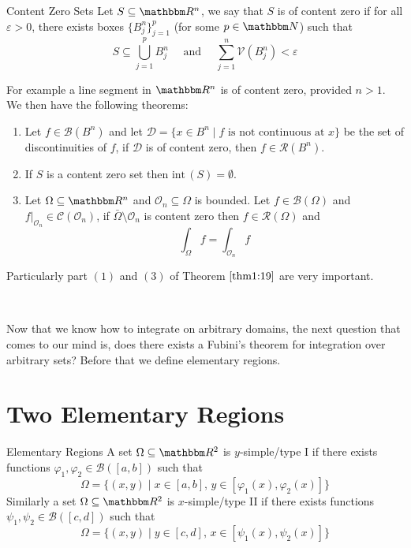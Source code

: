 \documentclass[Analysis-3.tex]{subfiles}
\begin{document}
\begin{Def}{Content Zero Sets}{}
    Let $S \subseteq \R^n$, we say that $S$ is of content zero if for all $\varepsilon > 0$, there exists boxes $\{ B_j^n \}_{j=1}^p$ (for some $p \in \N$) such that
    \[
        S \subseteq \bigcup_{j=1}^p B_j^n \quad \mbox{ and } \quad \sum_{j=1}^n \mathcal{V}(B^n_j) < \varepsilon
    \]
\end{Def}

For example a line segment in $\R^n$ is of content zero, provided $n > 1$. We then have the following theorems:

\begin{Thm}{}{}\label{thm1:19}
    \begin{enumerate}
        \item Let $f \in \mathscr{B}(B^n)$ and let $\mathcal{D} = \{ x \in B^n \mid f \mbox{ is not continuous at } x \}$ be the set of discontinuities of $f$, if $\mathcal{D}$ is of content zero, then $f \in \mathscr{R}(B^n)$.

        \item If $S$ is a content zero set then $\mathrm{int}\,(S) = \emptyset$.

        \item Let $\Omega \subseteq \R^n$ and $\mathcal{O}_n \subseteq \Omega$ is bounded. Let $f \in \mathscr{B}(\Omega)$ and $f\vert_{\mathcal{O}_n} \in \mathscr{C}(\mathcal{O}_n)$, if $\bar{\Omega}\setminus \mathcal{O}_n$ is content zero then $f \in \mathscr{R}(\Omega)$ and
              \[
                  \int_{\Omega} f = \int_{\mathcal{O}_n} f
              \]
    \end{enumerate}
\end{Thm}
Particularly part $(1)$ and $(3)$ of Theorem $\ref{thm1:19}$ are very important.

\

Now that we know how to integrate on arbitrary domains, the next question that comes to our mind is, does there exists a Fubini's theorem for integration over arbitrary sets? Before that we define elementary regions.

\section{Two Elementary Regions}

\begin{Def}{Elementary Regions}{}
    A set $\Omega \subseteq \R^2$ is $y$-simple/type I if there exists functions $\varphi_1, \varphi_2 \in \mathscr{B}([a,b])$ such that
    \[
        \Omega = \{ (x,y) \mid x \in [a,b], \, y \in [\varphi_1(x), \varphi_2(x)] \}
    \]
    Similarly a set $\Omega \subseteq \R^2$ is $x$-simple/type II if there exists functions $\psi_1, \psi_2 \in \mathscr{B}([c,d])$ such that
    \[
        \Omega = \{ (x,y) \mid y \in [c,d], \, x \in [ \psi_1(x), \psi_2(x) ] \}
    \]
\end{Def}
\end{document}
